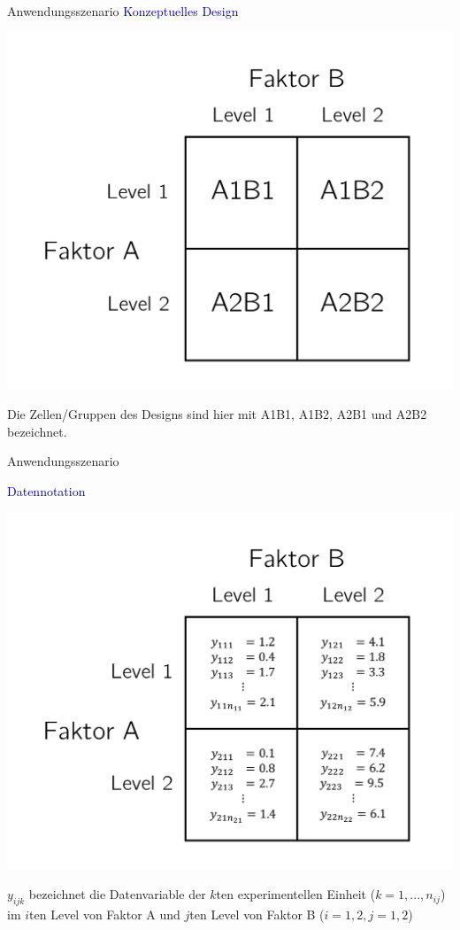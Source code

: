 \documentclass[
  8pt,
  ignorenonframetext,
]{beamer}
\begin{document}
\begin{frame}{Anwendungsszenario}
\protect\hypertarget{anwendungsszenario-1}{}
\textcolor{darkblue}{Konzeptuelles Design}

\center

\begin{center}\includegraphics[width=0.65\linewidth]{11_Abbildungen/alm_11_zva_konzept} \end{center}

\center
\small

Die Zellen/Gruppen des Designs sind hier mit A1B1, A1B2, A2B1 und A2B2
bezeichnet.
\end{frame}

\begin{frame}{Anwendungsszenario}
\protect\hypertarget{anwendungsszenario-2}{}
\vspace{2mm}

\textcolor{darkblue}{Datennotation}

\begin{center}\includegraphics[width=0.7\linewidth]{11_Abbildungen/alm_11_zva_datennotation} \end{center}

\center
\small

\(y_{ijk}\) bezeichnet die Datenvariable der \(k\)ten experimentellen
Einheit (\(k = 1,...,n_{ij}\)) im \(i\)ten Level von Faktor A und
\(j\)ten Level von Faktor B (\(i = 1,2, j = 1,2\))
\end{frame}
\end{document}
